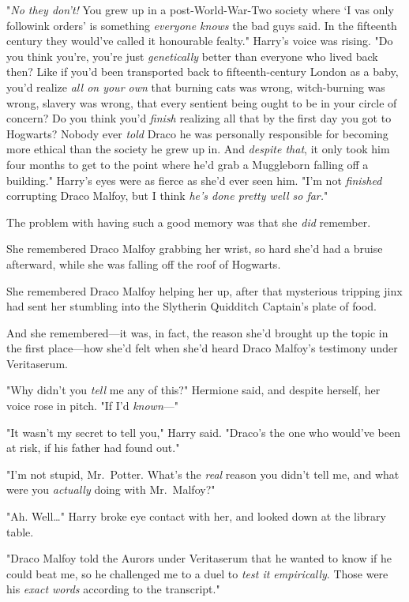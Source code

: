 "\emph{No they don't!} You grew up in a post-World-War-Two society where `I vas
only followink orders' is something \emph{everyone knows} the bad guys said. In
the fifteenth century they would've called it honourable fealty." Harry's voice
was rising. "Do you think you're, you're just \emph{genetically} better than
everyone who lived back then? Like if you'd been transported back to
fifteenth-century London as a baby, you'd realize \emph{all on your own} that
burning cats was wrong, witch-burning was wrong, slavery was wrong, that every
sentient being ought to be in your circle of concern? Do you think you'd
\emph{finish} realizing all that by the first day you got to Hogwarts? Nobody
ever \emph{told} Draco he was personally responsible for becoming more ethical
than the society he grew up in. And \emph{despite that}, it only took him four
months to get to the point where he'd grab a Muggleborn falling off a
building." Harry's eyes were as fierce as she'd ever seen him. "I'm not
\emph{finished} corrupting Draco Malfoy, but I think \emph{he's done pretty
well so far.}"

The problem with having such a good memory was that she \emph{did} remember.

She remembered Draco Malfoy grabbing her wrist, so hard she'd had a bruise
afterward, while she was falling off the roof of Hogwarts.

She remembered Draco Malfoy helping her up, after that mysterious tripping jinx
had sent her stumbling into the Slytherin Quidditch Captain's plate of food.

And she remembered---it was, in fact, the reason she'd brought up the topic in
the first place---how she'd felt when she'd heard Draco Malfoy's testimony
under Veritaserum.

"Why didn't you \emph{tell} me any of this?" Hermione said, and despite
herself, her voice rose in pitch. "If I'd \emph{known}---"

"It wasn't my secret to tell you," Harry said. "Draco's the one who would've
been at risk, if his father had found out."

"I'm not stupid, Mr.~Potter. What's the \emph{real} reason you didn't tell me,
and what were you \emph{actually} doing with Mr.~Malfoy?"

"Ah. Well{\ldots}" Harry broke eye contact with her, and looked down at the
library table.

"Draco Malfoy told the Aurors under Veritaserum that he wanted to know if he
could beat me, so he challenged me to a duel to \emph{test it empirically}.
Those were his \emph{exact words} according to the transcript."


